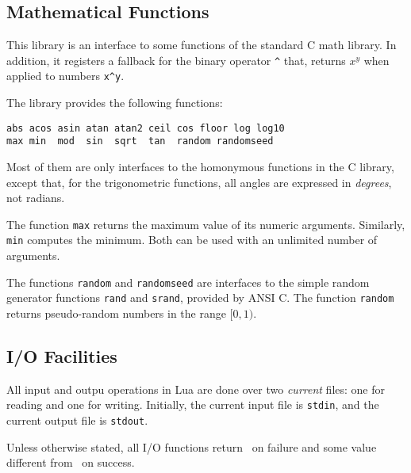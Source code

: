 \subsection{Mathematical Functions} \label{mathlib}

This library is an interface to some functions of the standard C math library.
In addition, it registers a fallback for the binary operator \verb'^' that,
returns $x^y$ when applied to numbers \verb'x^y'.

The library provides the following functions:
\begin{verbatim}
abs acos asin atan atan2 ceil cos floor log log10
max min  mod  sin  sqrt  tan  random randomseed
\end{verbatim}
Most of them
are only interfaces to the homonymous functions in the C library,
except that, for the trigonometric functions,
all angles are expressed in {\em degrees}, not radians.

The function \verb'max' returns the maximum
value of its numeric arguments.
Similarly, \verb'min' computes the minimum.
Both can be used with an unlimited number of arguments.

The functions \verb'random' and \verb'randomseed' are interfaces to
the simple random generator functions \verb'rand' and \verb'srand',
provided by ANSI C.
The function \verb'random' returns pseudo-random numbers in the range
$[0,1)$.


\subsection{I/O Facilities} \label{libio}

All input and outpu operations in Lua are done over two {\em current\/} files:
one for reading and one for writing.
Initially, the current input file is \verb'stdin',
and the current output file is \verb'stdout'.

Unless otherwise stated,
all I/O functions return \nil\ on failure and
some value different from \nil\ on success.

\subsubsection*{}

